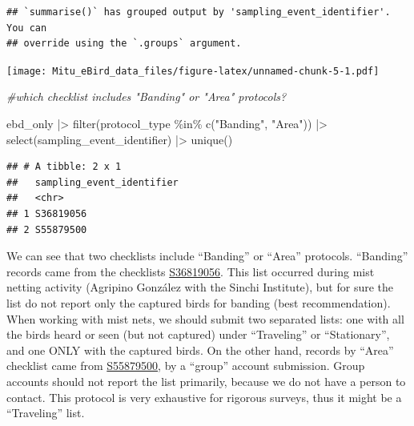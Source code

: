 \documentclass[
]{article}
\newenvironment{Shaded}{\begin{snugshade}}{\end{snugshade}}
\newcommand{\CommentTok}[1]{\textcolor[rgb]{0.56,0.35,0.01}{\textit{#1}}}
\newcommand{\FunctionTok}[1]{\textcolor[rgb]{0.00,0.00,0.00}{#1}}
\newcommand{\NormalTok}[1]{#1}
\newcommand{\SpecialCharTok}[1]{\textcolor[rgb]{0.00,0.00,0.00}{#1}}
\newcommand{\StringTok}[1]{\textcolor[rgb]{0.31,0.60,0.02}{#1}}
\begin{document}
\begin{verbatim}
## `summarise()` has grouped output by 'sampling_event_identifier'. You can
## override using the `.groups` argument.
\end{verbatim}

\texttt{[image: Mitu\_eBird\_data\_files/figure-latex/unnamed-chunk-5-1.pdf]}

\begin{Shaded}
\begin{Highlighting}[]
\CommentTok{\#which checklist includes "Banding" or "Area" protocols?}

\NormalTok{ebd\_only }\SpecialCharTok{|\textgreater{}}
  \FunctionTok{filter}\NormalTok{(protocol\_type }\SpecialCharTok{\%in\%} \FunctionTok{c}\NormalTok{(}\StringTok{"Banding"}\NormalTok{, }\StringTok{"Area"}\NormalTok{)) }\SpecialCharTok{|\textgreater{}}
  \FunctionTok{select}\NormalTok{(sampling\_event\_identifier) }\SpecialCharTok{|\textgreater{}}
  \FunctionTok{unique}\NormalTok{()}
\end{Highlighting}
\end{Shaded}

\begin{verbatim}
## # A tibble: 2 x 1
##   sampling_event_identifier
##   <chr>                    
## 1 S36819056                
## 2 S55879500
\end{verbatim}

We can see that two checklists include ``Banding'' or ``Area''
protocols. ``Banding'' records came from the checklists
\href{https://ebird.org/checklist/S36819056}{S36819056}. This list
occurred during mist netting activity (Agripino González with the Sinchi
Institute), but for sure the list do not report only the captured birds
for banding (best recommendation). When working with mist nets, we
should submit two separated lists: one with all the birds heard or seen
(but not captured) under ``Traveling'' or ``Stationary'', and one ONLY
with the captured birds. On the other hand, records by ``Area''
checklist came from
\href{https://ebird.org/checklist/S55879500}{S55879500}, by a ``group''
account submission. Group accounts should not report the list primarily,
because we do not have a person to contact. This protocol is very
exhaustive for rigorous surveys, thus it might be a ``Traveling'' list.
\end{document}
